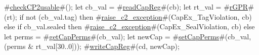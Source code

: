 #\hyperref[sailMIPSzcheckCP2usable]{checkCP2usable}#();
let cb_val = #\hyperref[sailMIPSzreadCapReg]{readCapReg}#(cb);
let rt_val = #\hyperref[sailMIPSzrGPR]{rGPR}#(rt);
if not (cb_val.tag) then
  #\hyperref[sailMIPSzraisezyc2zyexception]{raise\_c2\_exception}#(CapEx_TagViolation, cb)
else if cb_val.sealed then
  #\hyperref[sailMIPSzraisezyc2zyexception]{raise\_c2\_exception}#(CapEx_SealViolation, cb)
else
{
  let perms   = #\hyperref[sailMIPSzgetCapPerms]{getCapPerms}#(cb_val);
  let newCap  = #\hyperref[sailMIPSzsetCapPerms]{setCapPerms}#(cb_val, (perms & rt_val[30..0]));
  #\hyperref[sailMIPSzwriteCapReg]{writeCapReg}#(cd, newCap);
}
